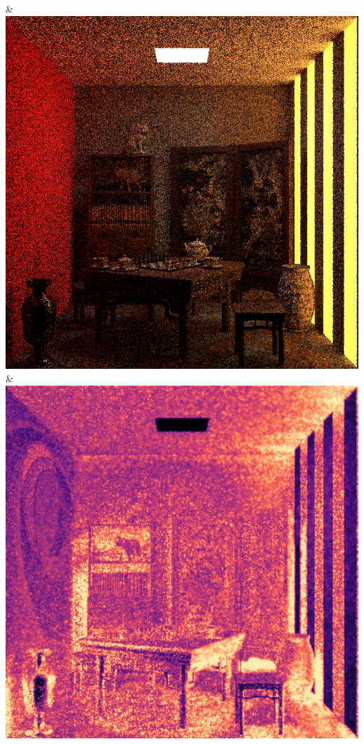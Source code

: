 & \includegraphics[width=\linewidth]{figures/py/tests/quality_comparison/sppm_1spp_chess.png}
\\
& \includegraphics[width=\linewidth]{figures/py/tests/quality_comparison/pt_1spp_chess_flip.png}
